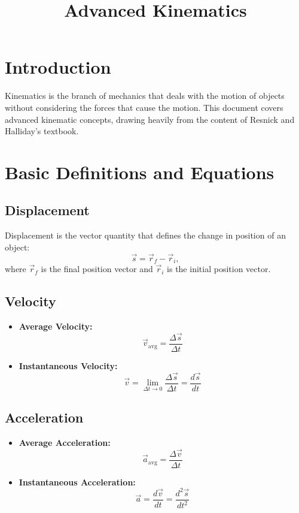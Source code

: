 \documentclass[a4paper,12pt]{article}
\title{\textbf{Advanced Kinematics}}
\author{}
\date{}
\begin{document}
\maketitle

\section*{Introduction}
Kinematics is the branch of mechanics that deals with the motion of objects without considering the forces that cause the motion. This document covers advanced kinematic concepts, drawing heavily from the content of Resnick and Halliday's textbook.

\section{Basic Definitions and Equations}

\subsection{Displacement}
Displacement is the vector quantity that defines the change in position of an object:
\[
\vec{s} = \vec{r}_f - \vec{r}_i,
\]
where \(\vec{r}_f\) is the final position vector and \(\vec{r}_i\) is the initial position vector.

\subsection{Velocity}
\begin{itemize}
    \item \textbf{Average Velocity:}
    \[
    \vec{v}_{\text{avg}} = \frac{\Delta \vec{s}}{\Delta t}
    \]
    \item \textbf{Instantaneous Velocity:}
    \[
    \vec{v} = \lim_{\Delta t \to 0} \frac{\Delta \vec{s}}{\Delta t} = \frac{d\vec{s}}{dt}
    \]
\end{itemize}

\subsection{Acceleration}
\begin{itemize}
    \item \textbf{Average Acceleration:}
    \[
    \vec{a}_{\text{avg}} = \frac{\Delta \vec{v}}{\Delta t}
    \]
    \item \textbf{Instantaneous Acceleration:}
    \[
    \vec{a} = \frac{d\vec{v}}{dt} = \frac{d^2\vec{s}}{dt^2}
    \]
\end{itemize}
\end{document}
